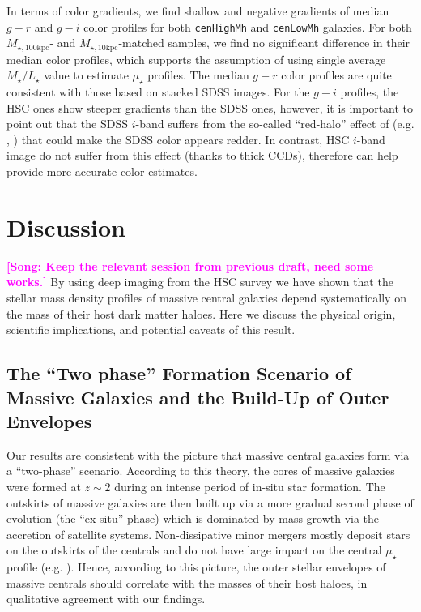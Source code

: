 \documentclass[a4paper,fleqn,usenatbib]{mnras}
\def\rbcg{\texttt{cenHighMh}}
\def\nbcg{\texttt{cenLowMh}}
\def\minn{{$M_{\star,10\mathrm{kpc}}$}}
\def\mtot{{$M_{\star,100\mathrm{kpc}}$}}
\def\m2l{{$M_{\star}/L_{\star}$}}
\def\mden{{$\mu_{\star}$}}
\newcommand{\song}[1]{\textcolor{magenta}{\textbf{[Song: #1]}}}
\begin{document}
    In terms of color gradients, we find shallow and negative gradients of median 
    $g-r$ and $g-i$ color profiles for both \rbcg{} and \nbcg{} galaxies. 
    For both \mtot{}- and \minn{}-matched samples, we find no significant difference
    in their median color profiles, which supports the assumption of using single 
    average \m2l{} value to estimate \mden{} profiles.
    The median $g-r$ color profiles are quite consistent with those based on 
    stacked SDSS images. 
    For the $g-i$ profiles, the HSC ones show steeper gradients than the SDSS ones, 
    however, it is important to point out that the SDSS $i$-band suffers from the 
    so-called ``red-halo'' effect of (e.g. \citealt{Wu2005}, \citealt{Tal2011}) that 
    could make the SDSS color appears redder. 
    In contrast, HSC $i$-band image do not suffer from this effect (thanks to thick 
    CCDs), therefore can help provide more accurate color estimates.
    


\section{Discussion}
    \label{sec:discussion}
    
    \song{Keep the relevant session from previous draft, need some works.}
    By using deep imaging from the HSC survey we have shown that the stellar mass 
    density profiles of massive central galaxies depend systematically on the mass 
    of their host dark matter haloes. 
    Here we discuss the physical origin, scientific implications, and potential 
    caveats of this result. 
    
    
\subsection{The ``Two phase'' Formation Scenario of Massive Galaxies and the 
            Build-Up of Outer Envelopes}
            
    Our results are consistent with the picture that massive central galaxies form via 
    a ``two-phase'' scenario. 
    According to this theory, the cores of massive galaxies were formed at $z{\sim} 2$ 
    during an intense period of in-situ star formation. 
    The outskirts of massive galaxies are then built up via a more gradual second 
    phase of evolution (the ``ex-situ'' phase) which is dominated by mass growth via 
    the accretion of satellite systems. 
    Non-dissipative minor mergers mostly deposit stars on the outskirts of the 
    centrals and do not have large impact on the central \mden{} profile 
    (e.g. \citealt{Oogi2013, Bedorf2013}). 
    Hence, according to this picture, the outer stellar envelopes of massive centrals 
    should correlate with the masses of their host haloes, in qualitative agreement with
    our findings. 
          
\end{document}
